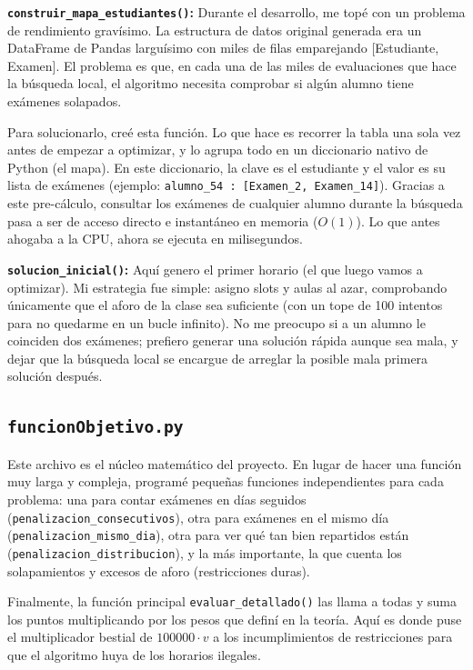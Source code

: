 \documentclass[12pt]{article}
\begin{document}
\textbf{\texttt{construir\_mapa\_estudiantes()}:} Durante el desarrollo, me topé con un problema de rendimiento gravísimo. La estructura de datos original generada era un DataFrame de Pandas larguísimo con miles de filas emparejando [Estudiante, Examen]. El problema es que, en cada una de las miles de evaluaciones que hace la búsqueda local, el algoritmo necesita comprobar si algún alumno tiene exámenes solapados. 

Para solucionarlo, creé esta función. Lo que hace es recorrer la tabla una sola vez antes de empezar a optimizar, y lo agrupa todo en un diccionario nativo de Python (el mapa). En este diccionario, la clave es el estudiante y el valor es su lista de exámenes (ejemplo: \texttt{alumno\_54 : [Examen\_2, Examen\_14]}). Gracias a este pre-cálculo, consultar los exámenes de cualquier alumno durante la búsqueda pasa a ser de acceso directo e instantáneo en memoria ($O(1)$). Lo que antes ahogaba a la CPU, ahora se ejecuta en milisegundos.

\textbf{\texttt{solucion\_inicial()}:} Aquí genero el primer horario (el que luego vamos a optimizar). Mi estrategia fue simple: asigno slots y aulas al azar, comprobando únicamente que el aforo de la clase sea suficiente (con un tope de 100 intentos para no quedarme en un bucle infinito). No me preocupo si a un alumno le coinciden dos exámenes; prefiero generar una solución rápida aunque sea mala, y dejar que la búsqueda local se encargue de arreglar la posible mala primera solución después.

\subsection{\texttt{funcionObjetivo.py}}
Este archivo es el núcleo matemático del proyecto. En lugar de hacer una función muy larga y compleja, programé pequeñas funciones independientes para cada problema: una para contar exámenes en días seguidos (\texttt{penalizacion\_consecutivos}), otra para exámenes en el mismo día (\texttt{penalizacion\_mismo\_dia}), otra para ver qué tan bien repartidos están (\texttt{penalizacion\_distribucion}), y la más importante, la que cuenta los solapamientos y excesos de aforo (restricciones duras).

Finalmente, la función principal \texttt{evaluar\_detallado()} las llama a todas y suma los puntos multiplicando por los pesos que definí en la teoría. Aquí es donde puse el multiplicador bestial de $100000 \cdot v$ a los incumplimientos de restricciones para que el algoritmo huya de los horarios ilegales.
\end{document}
